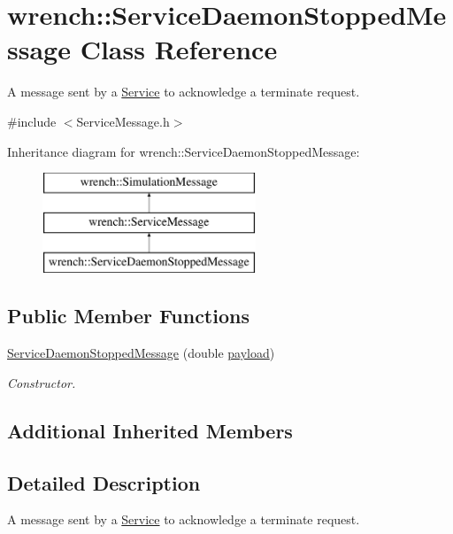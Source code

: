 \hypertarget{classwrench_1_1_service_daemon_stopped_message}{}\section{wrench\+:\+:Service\+Daemon\+Stopped\+Message Class Reference}
\label{classwrench_1_1_service_daemon_stopped_message}


A message sent by a \hyperlink{classwrench_1_1_service}{Service} to acknowledge a terminate request.  




{\ttfamily \#include $<$Service\+Message.\+h$>$}

Inheritance diagram for wrench\+:\+:Service\+Daemon\+Stopped\+Message\+:\begin{figure}[H]
\begin{center}
\leavevmode
\includegraphics[height=3.000000cm]{classwrench_1_1_service_daemon_stopped_message}
\end{center}
\end{figure}
\subsection*{Public Member Functions}
\begin{DoxyCompactItemize}
\item 
\hyperlink{classwrench_1_1_service_daemon_stopped_message_a253785d9c7d9599c22ae6370ca234435}{Service\+Daemon\+Stopped\+Message} (double \hyperlink{classwrench_1_1_simulation_message_a914f2732713f7c02898e66f05a7cb8a1}{payload})
\begin{DoxyCompactList}\small\item\em Constructor. \end{DoxyCompactList}\end{DoxyCompactItemize}
\subsection*{Additional Inherited Members}


\subsection{Detailed Description}
A message sent by a \hyperlink{classwrench_1_1_service}{Service} to acknowledge a terminate request. 

